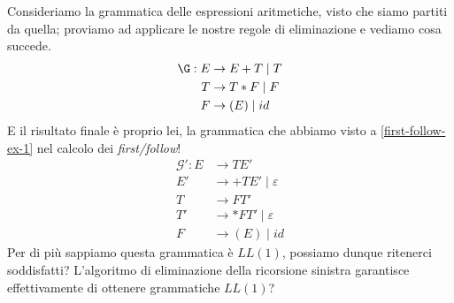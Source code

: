 \documentclass[class=book, crop=false, oneside, 12pt]{standalone}
\begin{document}
Consideriamo la grammatica delle espressioni aritmetiche, visto che siamo partiti da quella; proviamo ad applicare le nostre regole di eliminazione e vediamo cosa succede.
\begin{align*}
    \label{non-ll1_grammar}
    \G: E &\to E+T \mid T \\
    T &\to T*F \mid F \nonumber \\
    F &\to (E) \mid id \nonumber 
\end{align*}
E il risultato finale è proprio lei, la grammatica che abbiamo visto a \ref{first-follow-ex-1} nel calcolo dei \emph{first/follow}!%
\begin{align*}
    \mathcal{G'}: E &\rightarrow TE' \\
    E' &\rightarrow +TE' \mid \varepsilon \\
    T &\rightarrow FT' \\
    T' &\rightarrow *FT' \mid \varepsilon \\
    F &\rightarrow (E) \mid id
\end{align*}
Per di più sappiamo questa grammatica è \(LL(1)\), possiamo dunque ritenerci soddisfatti? L'algoritmo di eliminazione della ricorsione sinistra garantisce effettivamente di ottenere grammatiche \(LL(1)\)?
\end{document}
